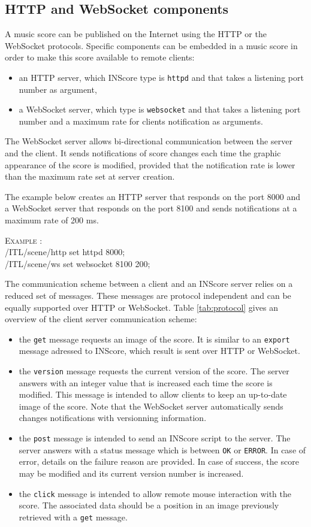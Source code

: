 \documentclass{article}
\newcounter{samplenum}
\newcommand{\code}[1]		{{\small \texttt{#1}}}
\newcommand{\sample}[1]		{ 	
								\begin{center}\colorbox{mygrey}{
								\begin{minipage}[t]{0.99\columnwidth} 
								\textsc{Example} \arabic{samplenum}: \vspace{1mm} \\
								\ttfamily \small #1  
								\end{minipage}}\end{center}
								\stepcounter{samplenum}
							}
\begin{document}
\subsection{HTTP and WebSocket components}

A music score can be published on the Internet using the HTTP or the WebSocket protocols. Specific components can be embedded in a music score in order to make this score available to remote clients:
\begin{itemize}
\item an HTTP server, which INScore type is \code{httpd} and  that takes a listening port number as argument,
\item a WebSocket server, which type is \code{websocket} and  that takes a listening port number and a maximum rate for clients notification as arguments.
\end{itemize}

The WebSocket server allows bi-directional communication between the server and the client. It sends notifications of score changes each time the graphic appearance of the score is modified, provided that the notification rate is lower than the maximum rate set at server creation. 

The example below creates an HTTP server that responds on the port 8000 and a WebSocket server that responds on the port 8100 and sends notifications at a maximum rate of 200 ms.
\sample{
  /ITL/scene/http set httpd 8000; \\
  /ITL/scene/ws set websocket 8100 200;
}

The communication scheme between a client and an INScore server relies on a reduced set of messages. These messages are protocol independent and can be equally supported over HTTP or WebSocket. Table \ref{tab:protocol} gives an overview of the client server communication scheme:
\begin{itemize}
\item the \code{get} message requests an image of the score. It is similar to an \code{export} message adressed to INScore, which result is sent over HTTP or WebSocket.
\item the \code{version} message requests the current version of the score. The server answers with an integer value that is increased each time the score is modified. This message is intended to allow clients to keep an up-to-date image of the score. Note that the WebSocket server automatically sends changes notifications with versionning information.
\item the \code{post} message is intended to send an INScore script to the server. The server answers with a status message which is between \code{OK} or \code{ERROR}. In case of error, details on the failure reason are provided. In case of success, the score may be modified and its current version number is increased. 
\item the \code{click} message is intended to allow remote mouse interaction with the score. The associated data should be a position in an image previously retrieved with a \code{get} message.
\end{itemize}
\end{document}
